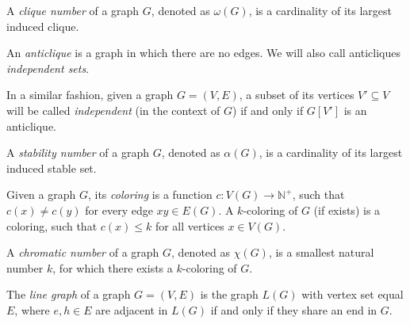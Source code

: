 \begin{defn}
  A \emph{clique number} of a graph $G$, denoted as $\omega(G)$, is a cardinality of its largest induced clique.
\end{defn}

\begin{defn}[anticlique]
  An \emph{anticlique} is a graph in which there are no edges. We will also call anticliques \emph{independent sets}. 
\end{defn}
In a similar fashion, given a graph $G = (V, E)$, a subset of its vertices $V' \subseteq V$ will be called \emph{independent} (in the context of $G$) if and only if $G[V']$ is an anticlique.

\begin{defn}
  A \emph{stability number} of a graph $G$, denoted as $\alpha(G)$, is a cardinality of its largest induced stable set.
\end{defn}

\begin{defn}[coloring]
  Given a graph $G$, its \emph{coloring} is a function $c: V(G) \rightarrow \mathbb{N}^+$, such that $c(x) \neq c(y)$ for every edge $xy \in E(G)$. A $k$-coloring of $G$ (if exists) is a coloring, such that $c(x) \leq k$ for all vertices $x \in V(G)$.
\end{defn}

\begin{defn}
  A \emph{chromatic number} of a graph $G$, denoted as $\chi(G)$, is a smallest natural number $k$, for which there exists a $k$-coloring of $G$.
\end{defn}

\begin{defn}
  The \emph{line graph} of a graph $G = (V, E)$ is the graph $L(G)$ with vertex set equal $E$, where $e, h \in E$ are adjacent in $L(G)$ if and only if they share an end in $G$.
\end{defn}


